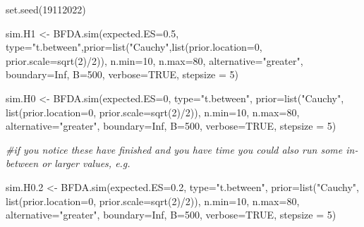 \documentclass[
]{book}
\newenvironment{Shaded}{\begin{snugshade}}{\end{snugshade}}
\newcommand{\AttributeTok}[1]{\textcolor[rgb]{0.77,0.63,0.00}{#1}}
\newcommand{\CommentTok}[1]{\textcolor[rgb]{0.56,0.35,0.01}{\textit{#1}}}
\newcommand{\ConstantTok}[1]{\textcolor[rgb]{0.00,0.00,0.00}{#1}}
\newcommand{\DecValTok}[1]{\textcolor[rgb]{0.00,0.00,0.81}{#1}}
\newcommand{\FloatTok}[1]{\textcolor[rgb]{0.00,0.00,0.81}{#1}}
\newcommand{\FunctionTok}[1]{\textcolor[rgb]{0.00,0.00,0.00}{#1}}
\newcommand{\NormalTok}[1]{#1}
\newcommand{\OtherTok}[1]{\textcolor[rgb]{0.56,0.35,0.01}{#1}}
\newcommand{\SpecialCharTok}[1]{\textcolor[rgb]{0.00,0.00,0.00}{#1}}
\newcommand{\StringTok}[1]{\textcolor[rgb]{0.31,0.60,0.02}{#1}}
\begin{document}
\begin{Shaded}
\begin{Highlighting}[]
\FunctionTok{set.seed}\NormalTok{(}\DecValTok{19112022}\NormalTok{)}

\NormalTok{sim.H1 }\OtherTok{\textless{}{-}} \FunctionTok{BFDA.sim}\NormalTok{(}\AttributeTok{expected.ES=}\FloatTok{0.5}\NormalTok{, }\AttributeTok{type=}\StringTok{"t.between"}\NormalTok{,}\AttributeTok{prior=}\FunctionTok{list}\NormalTok{(}\StringTok{"Cauchy"}\NormalTok{,}\FunctionTok{list}\NormalTok{(}\AttributeTok{prior.location=}\DecValTok{0}\NormalTok{, }\AttributeTok{prior.scale=}\FunctionTok{sqrt}\NormalTok{(}\DecValTok{2}\NormalTok{)}\SpecialCharTok{/}\DecValTok{2}\NormalTok{)), }\AttributeTok{n.min=}\DecValTok{10}\NormalTok{, }\AttributeTok{n.max=}\DecValTok{80}\NormalTok{, }\AttributeTok{alternative=}\StringTok{"greater"}\NormalTok{, }\AttributeTok{boundary=}\ConstantTok{Inf}\NormalTok{, }\AttributeTok{B=}\DecValTok{500}\NormalTok{, }\AttributeTok{verbose=}\ConstantTok{TRUE}\NormalTok{, }\AttributeTok{stepsize =} \DecValTok{5}\NormalTok{)}

\NormalTok{sim.H0 }\OtherTok{\textless{}{-}} \FunctionTok{BFDA.sim}\NormalTok{(}\AttributeTok{expected.ES=}\DecValTok{0}\NormalTok{, }\AttributeTok{type=}\StringTok{"t.between"}\NormalTok{, }\AttributeTok{prior=}\FunctionTok{list}\NormalTok{(}\StringTok{"Cauchy"}\NormalTok{, }\FunctionTok{list}\NormalTok{(}\AttributeTok{prior.location=}\DecValTok{0}\NormalTok{, }\AttributeTok{prior.scale=}\FunctionTok{sqrt}\NormalTok{(}\DecValTok{2}\NormalTok{)}\SpecialCharTok{/}\DecValTok{2}\NormalTok{)), }\AttributeTok{n.min=}\DecValTok{10}\NormalTok{, }\AttributeTok{n.max=}\DecValTok{80}\NormalTok{, }\AttributeTok{alternative=}\StringTok{"greater"}\NormalTok{, }\AttributeTok{boundary=}\ConstantTok{Inf}\NormalTok{, }\AttributeTok{B=}\DecValTok{500}\NormalTok{, }\AttributeTok{verbose=}\ConstantTok{TRUE}\NormalTok{, }\AttributeTok{stepsize =} \DecValTok{5}\NormalTok{)}

\CommentTok{\#if you notice these have finished and you have time you could also run some in{-}between or larger values, e.g.}

\NormalTok{sim.H0}\FloatTok{.2} \OtherTok{\textless{}{-}} \FunctionTok{BFDA.sim}\NormalTok{(}\AttributeTok{expected.ES=}\FloatTok{0.2}\NormalTok{, }\AttributeTok{type=}\StringTok{"t.between"}\NormalTok{, }\AttributeTok{prior=}\FunctionTok{list}\NormalTok{(}\StringTok{"Cauchy"}\NormalTok{, }\FunctionTok{list}\NormalTok{(}\AttributeTok{prior.location=}\DecValTok{0}\NormalTok{, }\AttributeTok{prior.scale=}\FunctionTok{sqrt}\NormalTok{(}\DecValTok{2}\NormalTok{)}\SpecialCharTok{/}\DecValTok{2}\NormalTok{)), }\AttributeTok{n.min=}\DecValTok{10}\NormalTok{, }\AttributeTok{n.max=}\DecValTok{80}\NormalTok{, }\AttributeTok{alternative=}\StringTok{"greater"}\NormalTok{, }\AttributeTok{boundary=}\ConstantTok{Inf}\NormalTok{, }\AttributeTok{B=}\DecValTok{500}\NormalTok{, }\AttributeTok{verbose=}\ConstantTok{TRUE}\NormalTok{, }\AttributeTok{stepsize =} \DecValTok{5}\NormalTok{)}


\end{Highlighting}
\end{Shaded}
\end{document}
